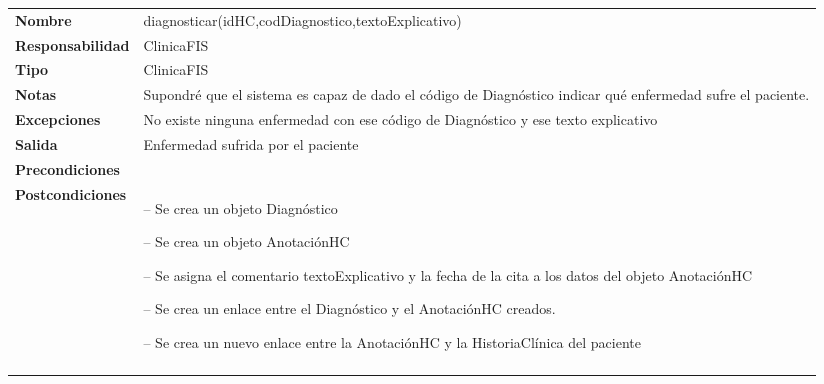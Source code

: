 \begin{table}[H]
\centering
	  \begin{tabularx}{\textwidth}{l|X}
    \textbf{Nombre}        & diagnosticar(idHC,codDiagnostico,textoExplicativo) \\ 
    \textbf{Responsabilidad}  & ClinicaFIS \\ 
    \textbf{Tipo}        &  ClinicaFIS\\ 
    \textbf{Notas}        &  Supondré que el sistema es capaz de dado el código de Diagnóstico indicar qué enfermedad sufre el paciente.\\ 
    \textbf{Excepciones}    & No existe ninguna enfermedad con ese código de Diagnóstico y ese texto explicativo \\ 
    \textbf{Salida}        & Enfermedad sufrida por el paciente  \\ 
    \textbf{Precondiciones}    &  \\ 
    \textbf{Postcondiciones}  & 
    \begin{itemizenomargins}
   \item[--] Se crea un objeto Diagnóstico
   \item[--] Se crea un objeto AnotaciónHC
   \item[--] Se asigna el comentario textoExplicativo y la fecha de la cita a los datos del objeto AnotaciónHC
   \item[--] Se crea un enlace entre el Diagnóstico y el AnotaciónHC creados.
   \item[--] Se crea un nuevo enlace entre la AnotaciónHC y la HistoriaClínica del paciente
   \end{itemizenomargins} \\ \\ 
  \end{tabularx}

\end{table}


